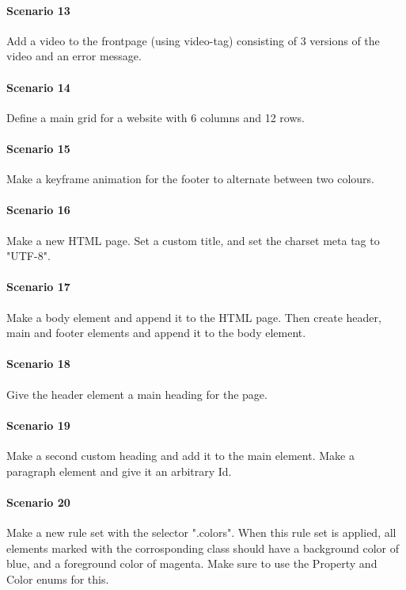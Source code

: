 \documentclass[12pt]{article}
\begin{document}
\paragraph{Scenario 13}
Add a video to the frontpage (using video-tag) consisting of 3 versions of the video and an error message.

\paragraph{Scenario 14}
Define a main grid for a website with 6 columns and 12 rows.

\paragraph{Scenario 15}
Make a keyframe animation for the footer to alternate between two colours.

\paragraph{Scenario 16}
Make a new HTML page. Set a custom title, and set the charset meta tag to "UTF-8".

\paragraph{Scenario 17}
Make a body element and append it to the HTML page. Then create header, main and footer elements and append it to the body element.

\paragraph{Scenario 18}
Give the header element a main heading for the page.

\paragraph{Scenario 19}
Make a second custom heading and add it to the main element. Make a paragraph element and give it an arbitrary Id.

\paragraph{Scenario 20}
Make a new rule set with the selector ".colors". When this rule set is applied, all elements marked with the corrosponding class should have a background color of blue, and a foreground color of magenta. Make sure to use the Property and Color enums for this.
\end{document}
